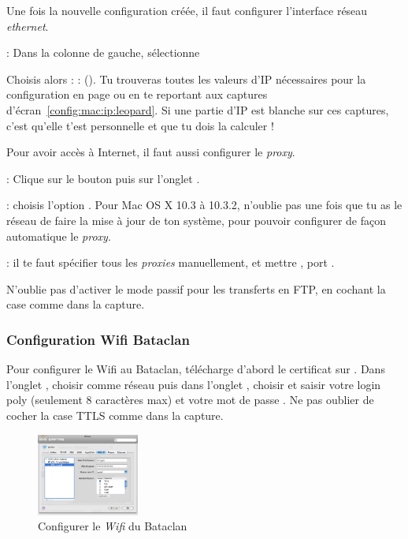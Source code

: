 Une fois la nouvelle configuration créée, il faut configurer l'interface réseau \emph{ethernet}.



 : Dans la colonne de gauche, sélectionne 

Choisis alors  :%
 :  (). Tu trouveras toutes les valeurs d'IP nécessaires pour la configuration en page \pageref{calcul_ip} ou en te reportant aux captures d'écran~\ref{config:mac:ip:leopard}. Si une partie d'IP est blanche sur ces captures, c'est qu'elle t'est personnelle et que tu dois la calculer !


  
  



Pour avoir accès à Internet, il faut aussi configurer le \emph{proxy}.

 : Clique sur le bouton  puis sur l'onglet .


 :  choisis l'option . Pour Mac OS X 10.3 à 10.3.2, n'oublie pas une fois que tu as le réseau de faire la mise à jour de ton système, pour pouvoir configurer de façon automatique le \emph{proxy}.

 : il te faut spécifier tous les
\emph{proxies} manuellement, et mettre , port .


N'oublie pas d'activer le mode passif pour les transferts en FTP, en cochant la case comme dans la capture.



  
\subsubsection{Configuration Wifi Bataclan}
Pour configurer le Wifi au Bataclan, télécharge d'abord  le certificat sur .
Dans l'onglet , choisir comme réseau  puis dans l'onglet , choisir  et saisir votre login poly (seulement 8 caractères max) et votre mot de passe . Ne pas oublier de cocher la case TTLS comme dans la capture.

\begin{figure}[!h]
    \begin{center}
      \includegraphics[width=0.3\textwidth]{images/mac_config_wifi.png} 
      \caption{Configurer le \emph{Wifi} du Bataclan}
    \end{center}
  \end{figure}

